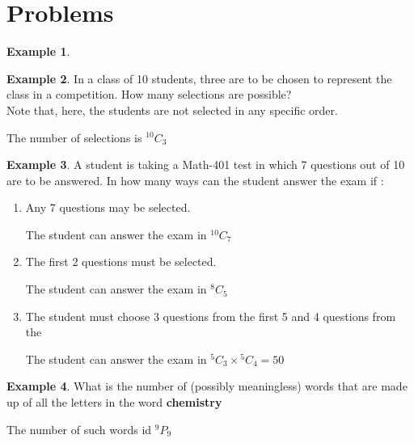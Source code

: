 \documentclass[12pt]{article}
\theoremstyle{definition}
\newtheorem{exmp}{Example}[section]
\newcommand*{\Perm}[2]{{}^{#1}\!P_{#2}}%
\newcommand*{\Comb}[2]{{}^{#1}C_{#2}}%
\begin{document}
\section{Problems}
\begin{exmp}

\end{exmp}    
\begin{exmp}
    In a class of 10 students, three are to be chosen to represent the class in a
    competition.  How many selections are possible? \\

    Note that, here, the students are not selected in any 
    specific order.

    The number of selections is $\Comb{10}{3} $

\end{exmp}    

\begin{exmp}
    A student is taking a Math-401 test in which 7 questions out of 10 are to be
    answered. In how many ways can the student answer the exam if :
\end{exmp}    
\begin{enumerate}
    \item Any 7 questions may be selected.
        \begin{center}
            The student can answer the exam in $\Comb{10}{7}$
        \end{center}
    \item The first 2 questions must be selected.
        \begin{center}
            The student can answer the exam in $\Comb{8}{5}$
        \end{center}
    \item The student must choose 3 questions from the first 5 and 4 questions from the
        \begin{center}
            The student can answer the exam in $\Comb{5}{3} \times \Comb{5}{4} = 50$
        \end{center}
\end{enumerate}       


\begin{exmp}
    What is the number of (possibly meaningless) words that are made up of all the
    letters in the word \textbf{chemistry}
\end{exmp}    
\begin{center}
    The number of such words id $\Perm{9}{9}$
\end{center}
\end{document}
